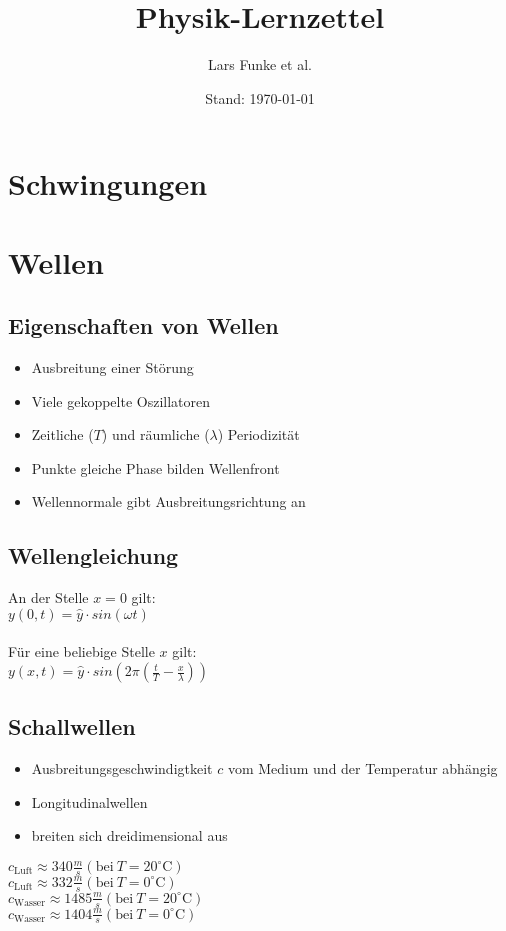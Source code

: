 \documentclass[12pt,a4paper,titlepage]{article}
\title{Physik-Lernzettel}
\author{Lars Funke et al.}
\date{Stand: \today}
\begin{document}
	\maketitle
	\tableofcontents
	\pagebreak
	\section{Schwingungen}
	\section{Wellen}
		\subsection{Eigenschaften von Wellen}
			\begin{itemize}
				\item Ausbreitung einer Störung
				\item Viele gekoppelte Oszillatoren
				\item Zeitliche ($T$) und räumliche ($\lambda$) Periodizität
				\item Punkte gleiche Phase bilden Wellenfront
				\item Wellennormale gibt Ausbreitungsrichtung an
			\end{itemize}
		\subsection{Wellengleichung}
			An der Stelle $x = 0$ gilt:\\
			$ y(0,t) = \hat{y} \cdot sin(\omega t)$ \\\\
			Für eine beliebige Stelle $x$ gilt:\\
			$ y(x,t) = \hat{y} \cdot sin(2 \pi (\frac{t}{T} - \frac{x}{\lambda} )) $
		\subsection{Schallwellen}
			\begin{itemize}
				\item Ausbreitungsgeschwindigtkeit $c$ vom Medium und der Temperatur abhängig
				\item Longitudinalwellen
				\item breiten sich dreidimensional aus
			\end{itemize}
			$c_{\mathrm{Luft}} \approx 340 \frac{m}{s} (\mathrm{bei}\ T = 20^{\circ}\mathrm{C})$\\
			$c_{\mathrm{Luft}} \approx 332 \frac{m}{s} (\mathrm{bei}\ T = 0^{\circ}\mathrm{C})$\\
			$c_{\mathrm{Wasser}} \approx 1485 \frac{m}{s} (\mathrm{bei}\ T = 20^{\circ}\mathrm{C})$\\
			$c_{\mathrm{Wasser}} \approx 1404 \frac{m}{s} (\mathrm{bei}\ T = 0^{\circ}\mathrm{C})$
\end{document}
